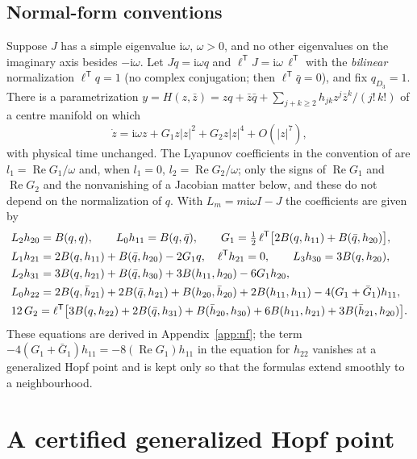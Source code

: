 \documentclass[11pt,a4paper]{article}
\theoremstyle{plain}
\theoremstyle{definition}
\theoremstyle{remark}
\newcommand{\ii}{\mathrm i}
\newcommand{\T}{\mathsf T}
\newcommand{\abs}[1]{\lvert#1\rvert}
\DeclareMathOperator{\Ree}{Re}
\begin{document}
\subsection{Normal-form conventions}\label{sec:nf}
Suppose $J$ has a simple eigenvalue $\ii\omega$, $\omega>0$, and no other eigenvalues on the imaginary axis besides $-\ii\omega$. Let $Jq=\ii\omega q$ and $\ell^\T J=\ii\omega\,\ell^\T$ with the \emph{bilinear} normalization $\ell^\T q=1$ (no complex conjugation; then $\ell^\T\bar q=0$), and fix $q_{D_3}=1$. There is a parametrization $y=H(z,\bar z)=zq+\bar z\bar q+\sum_{j+k\ge2}h_{jk}z^j\bar z^k/(j!\,k!)$ of a centre manifold on which
\begin{equation}\label{eq:nf}
\dot z=\ii\omega z+G_1z\abs z^2+G_2z\abs z^4+O(\abs z^7),
\end{equation}
with physical time unchanged. The Lyapunov coefficients in the convention of \cite{Kuznetsov23} are $l_1=\Ree G_1/\omega$ and, when $l_1=0$, $l_2=\Ree G_2/\omega$; only the signs of $\Ree G_1$ and $\Ree G_2$ and the nonvanishing of a Jacobian matter below, and these do not depend on the normalization of $q$. With $L_m=m\ii\omega I-J$ the coefficients are given by
\begin{align}
&L_2h_{20}=B(q,q),\qquad L_0h_{11}=B(q,\bar q),\qquad
G_1=\tfrac12\,\ell^\T\bigl[2B(q,h_{11})+B(\bar q,h_{20})\bigr],\label{eq:G1}\\
&L_1h_{21}=2B(q,h_{11})+B(\bar q,h_{20})-2G_1q,\quad \ell^\T h_{21}=0,\qquad L_3h_{30}=3B(q,h_{20}),\notag\\
&L_2h_{31}=3B(q,h_{21})+B(\bar q,h_{30})+3B(h_{11},h_{20})-6G_1h_{20},\notag\\
&L_0h_{22}=2B(q,\bar h_{21})+2B(\bar q,h_{21})+B(h_{20},\bar h_{20})+2B(h_{11},h_{11})-4(G_1+\bar G_1)h_{11},\notag\\
&12\,G_2=\ell^\T\bigl[3B(q,h_{22})+2B(\bar q,h_{31})+B(\bar h_{20},h_{30})+6B(h_{11},h_{21})+3B(\bar h_{21},h_{20})\bigr].\label{eq:G2}
\end{align}
These equations are derived in Appendix~\ref{app:nf}; the term $-4(G_1+\bar G_1)h_{11}=-8(\Ree G_1)h_{11}$ in the equation for $h_{22}$ vanishes at a generalized Hopf point and is kept only so that the formulas extend smoothly to a neighbourhood.

\section{A certified generalized Hopf point}\label{sec:GH}
\end{document}
